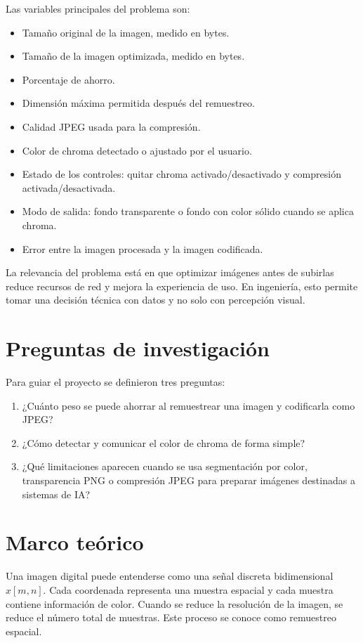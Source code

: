 \documentclass[12pt,letterpaper]{article}
\begin{document}
Las variables principales del problema son:
\begin{itemize}
  \item Tamaño original de la imagen, medido en bytes.
  \item Tamaño de la imagen optimizada, medido en bytes.
  \item Porcentaje de ahorro.
  \item Dimensión máxima permitida después del remuestreo.
  \item Calidad JPEG usada para la compresión.
  \item Color de chroma detectado o ajustado por el usuario.
  \item Estado de los controles: quitar chroma activado/desactivado y compresión activada/desactivada.
  \item Modo de salida: fondo transparente o fondo con color sólido cuando se aplica chroma.
  \item Error entre la imagen procesada y la imagen codificada.
\end{itemize}

La relevancia del problema está en que optimizar imágenes antes de subirlas reduce recursos de red y mejora la experiencia de uso. En ingeniería, esto permite tomar una decisión técnica con datos y no solo con percepción visual.

\section{Preguntas de investigación}
Para guiar el proyecto se definieron tres preguntas:
\begin{enumerate}
  \item ¿Cuánto peso se puede ahorrar al remuestrear una imagen y codificarla como JPEG?
  \item ¿Cómo detectar y comunicar el color de chroma de forma simple?
  \item ¿Qué limitaciones aparecen cuando se usa segmentación por color, transparencia PNG o compresión JPEG para preparar imágenes destinadas a sistemas de IA?
\end{enumerate}

\section{Marco teórico}
Una imagen digital puede entenderse como una señal discreta bidimensional \(x[m,n]\). Cada coordenada representa una muestra espacial y cada muestra contiene información de color. Cuando se reduce la resolución de la imagen, se reduce el número total de muestras. Este proceso se conoce como remuestreo espacial.
\end{document}
